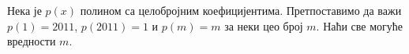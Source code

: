 Нека је $p(x)$ полином са целобројним коефицијентима.
Претпоставимо да важи $p(1) = 2011$, $p(2011) = 1$ и $p(m) = m$ за неки цео
број $m$.
Наћи све могуће вредности $m$.

\solution

